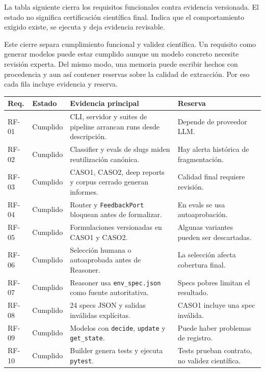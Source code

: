 La tabla siguiente cierra los requisitos funcionales contra evidencia
versionada. El estado no significa certificación científica final. Indica que el
comportamiento exigido existe, se ejecuta y deja evidencia revisable.

Este cierre separa cumplimiento funcional y validez científica. Un requisito
como generar modelos puede estar cumplido aunque un modelo concreto necesite
revisión experta. Del mismo modo, una memoria puede escribir hechos con
procedencia y aun así contener reservas sobre la calidad de extracción. Por eso
cada fila incluye evidencia y reserva.

\begin{table}[H]
\begin{center}
\scriptsize
\begin{tabular}{|p{1.5cm}|p{2.0cm}|p{6.2cm}|p{3.0cm}|} \hline
\textbf{Req.} & \textbf{Estado} & \textbf{Evidencia principal} & \textbf{Reserva} \\ \hline
RF-01 & Cumplido & CLI, servidor y suites de pipeline arrancan runs desde descripción. & Depende de proveedor LLM. \\ \hline
RF-02 & Cumplido & Classifier y evals de slugs miden reutilización canónica. & Hay alerta histórica de fragmentación. \\ \hline
RF-03 & Cumplido & CASO1, CASO2, deep reports y corpus cerrado generan informes. & Calidad final requiere revisión. \\ \hline
RF-04 & Cumplido & Router y \texttt{FeedbackPort} bloquean antes de formalizar. & En evals se usa autoaprobación. \\ \hline
RF-05 & Cumplido & Formulaciones versionadas en CASO1 y CASO2. & Algunas variantes pueden ser descartadas. \\ \hline
RF-06 & Cumplido & Selección humana o autoaprobada antes de Reasoner. & La selección afecta cobertura final. \\ \hline
RF-07 & Cumplido & Reasoner usa \texttt{env\_spec.json} como fuente autoritativa. & Specs pobres limitan el resultado. \\ \hline
RF-08 & Cumplido & 24 specs JSON y salidas inválidas explícitas. & CASO1 incluye una spec inválida. \\ \hline
RF-09 & Cumplido & Modelos con \texttt{decide}, \texttt{update} y \texttt{get\_state}. & Puede haber problemas de registro. \\ \hline
RF-10 & Cumplido & Builder genera tests y ejecuta \texttt{pytest}. & Tests prueban contrato, no validez científica. \\ \hline

\end{tabular}
\end{center}
\end{table}
